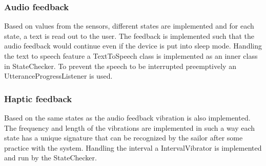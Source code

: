 \subsubsection{Audio feedback}
Based on values from the sensors, different states are implemented and for each state, a text is read out to the user. The feedback is implemented such that the audio feedback would continue even if the device is put into sleep mode. Handling the text to speech feature a TextToSpeech\cite{texttospeech} class is implemented as an inner class in StateChecker. To prevent the speech to be interrupted preemptively an UtteranceProgressListener\cite{utter} is used. 

\subsubsection{Haptic feedback}
Based on the same states as the audio feedback vibration is also implemented. The frequency and length of the vibrations are implemented in such a way each state has a unique signature that can be recognized by the sailor after some practice with the system. Handling the interval a IntervalVibrator is implemented and run by the StateChecker.

